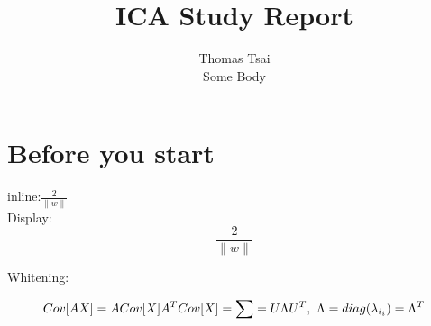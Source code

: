 \documentclass[11pt]{article}
\title{\textbf{ICA Study Report}}
\author{Thomas Tsai\\
		Some Body}
\date{}
\begin{document}
\maketitle

\section{Before you start}

inline:$ \frac{2}{\|w\|}$ \\[2em]

Display:
\[ \frac{2}{\|w\|} \]

Whitening:

\begin{equation}
Cov[AX] = ACov[X]A^{T}\\\\
Cov[X] = \sum = U \Lambda U^{T},\ \Lambda=diag(\lambda_{i_i})=\Lambda ^T\\\\
\end{equation}
\end{document}
